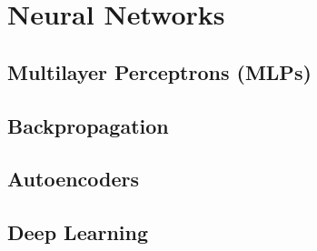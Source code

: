 \section{Neural Networks}

\subsection{Multilayer Perceptrons (MLPs)}

\subsection{Backpropagation}

\subsection{Autoencoders}

\subsection{Deep Learning}